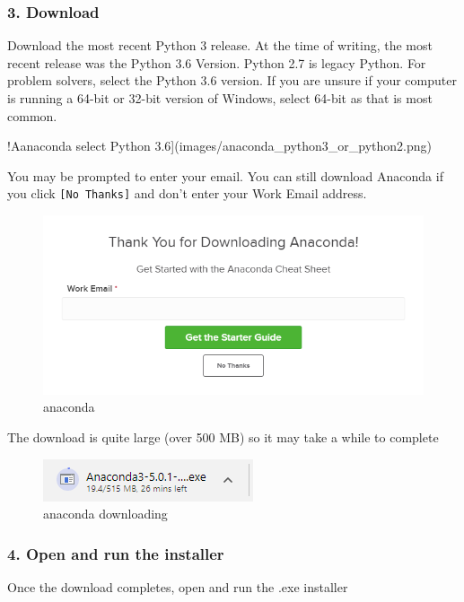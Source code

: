 \documentclass{book}
\makeatletter
\def\maxwidth{\ifdim\Gin@nat@width>\linewidth\linewidth
    \else\Gin@nat@width\fi}
\let\Oldincludegraphics\includegraphics
\renewcommand{\includegraphics}[1]{\Oldincludegraphics[width=.8\maxwidth]{#1}}
\makeatother
\begin{document}
    \subsubsection{3. Download}\label{download}

Download the most recent Python 3 release. At the time of writing, the
most recent release was the Python 3.6 Version. Python 2.7 is legacy
Python. For problem solvers, select the Python 3.6 version. If you are
unsure if your computer is running a 64-bit or 32-bit version of
Windows, select 64-bit as that is most common.

!Aanaconda select Python
3.6{]}(images/anaconda\_python3\_or\_python2.png)

You may be prompted to enter your email. You can still download Anaconda
if you click \lstinline![No Thanks]! and don't enter your Work Email
address.

\begin{figure}
\centering
\includegraphics{images/anaconda_enter_email.png}
\caption{anaconda}
\end{figure}

The download is quite large (over 500 MB) so it may take a while to
complete

\begin{figure}
\centering
\includegraphics{images/anaconda_downloading.png}
\caption{anaconda downloading}
\end{figure}

    \subsubsection{4. Open and run the
installer}\label{open-and-run-the-installer}

Once the download completes, open and run the .exe installer
\end{document}

